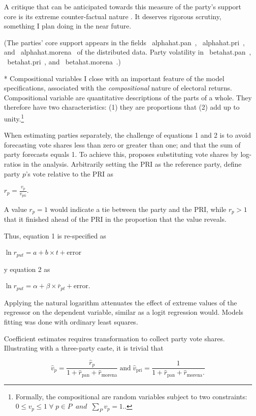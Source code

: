 \documentclass[letter,12pt]{article}
\begin{document}
A critique that can be anticipated towards this measure of the party's support core is its extreme counter-factual nature \citep{king.zeng.counterfactuals2006pa}. It deserves rigorous scrutiny, something I plan doing in the near future. 

(The parties' core support appears in the fields ~alphahat.pan~, ~alphahat.pri~, and ~alphahat.morena~ of the distributed data. Party volatility in ~betahat.pan~, ~betahat.pri~, and ~betahat.morena~.)

* Compositional variables
I close with an important feature of the model specifications, associated with the \emph{compositional} nature of electoral returns. Compositional variable are quantitative descriptions of the parts of a whole. They therefore have two characteristics: (1) they are proportions that (2) add up to unity.\footnote{Formally, the compositional are random variables subject to two constraints: 
$0 \leq v_p \leq 1 \; \forall \; p \in P \; \; and \; \; \sum_P v_p = 1.$.} 

When estimating parties separately, the challenge of equations 1 and 2 is to avoid forecasting vote shares less than zero or greater than one; and that the sum of party forecasts equals 1. To achieve this, \citet{aitchison.1986} proposes substituting vote shares by log-ratios in the analysis. Arbitrarily setting the PRI as the reference party, define party $p$'s vote relative to the PRI as 

$r_p = \frac{v_p}{v_{\text{pri}}}.$

A value $r_p=1$ would indicate a tie between the party and the PRI, while $r_p>1$ that it finished ahead of the PRI in the proportion that the value reveals. 

Thus, equation 1 is re-specified as

$\ln r_{put} = a + b \times t + \text{error}$

y equation 2 as

$\ln r_{put} = \alpha + \beta \times \bar{r}_{pt} + \text{error}.$

Applying the natural logarithm attenuates the effect of extreme values of the regressor on the dependent variable, similar as a logit regression would. Models fitting was done with ordinary least squares. 

Coefficient estimates requires transformation to collect party vote shares. Illustrating with a three-party caste, it is trivial that 

\begin{equation}
\hat{v}_p = \frac{\hat{r}_p}{1 + \hat{r}_{\text{pan}} + \hat{r}_{\text{morena}}} \; \text{and} \;
\hat{v}_{\text{pri}} = \frac{1}{1 + \hat{r}_{\text{pan}} + \hat{r}_{\text{morena}}.}
\end{equation}
\end{document}
